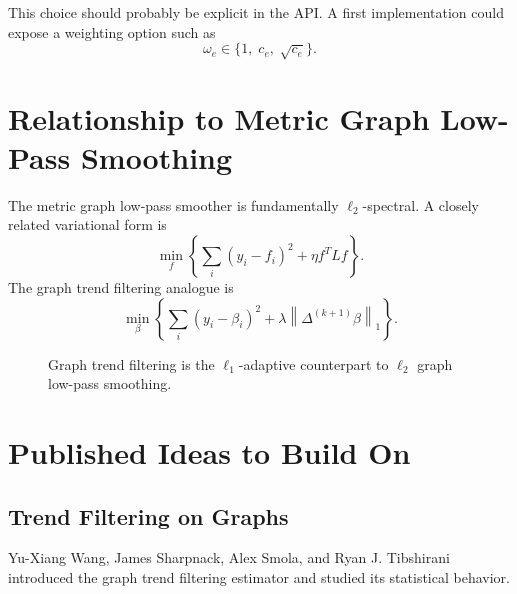 \documentclass[11pt]{article}
\newcommand{\norm}[1]{\left\lVert #1 \right\rVert}
\begin{document}
This choice should probably be explicit in the API.  A first implementation
could expose a weighting option such as
\[
  \omega_e \in \{1,\;c_e,\;\sqrt{c_e}\}.
\]

\section{Relationship to Metric Graph Low-Pass Smoothing}

The metric graph low-pass smoother is fundamentally \(\ell_2\)-spectral.  A
closely related variational form is
\[
  \min_f
  \left\{
  \sum_i(y_i-f_i)^2+\eta f^T L f
  \right\}.
\]
The graph trend filtering analogue is
\[
  \min_\beta
  \left\{
  \sum_i(y_i-\beta_i)^2+\lambda\norm{\Delta^{(k+1)}\beta}_1
  \right\}.
\]

\begin{figure}[ht]
\centering
{}
\caption{Graph trend filtering is the \(\ell_1\)-adaptive counterpart to
\(\ell_2\) graph low-pass smoothing.}
\end{figure}

\section{Published Ideas to Build On}

\subsection{Trend Filtering on Graphs}

Yu-Xiang Wang, James Sharpnack, Alex Smola, and Ryan J. Tibshirani introduced
the graph trend filtering estimator and studied its statistical behavior.
\end{document}

